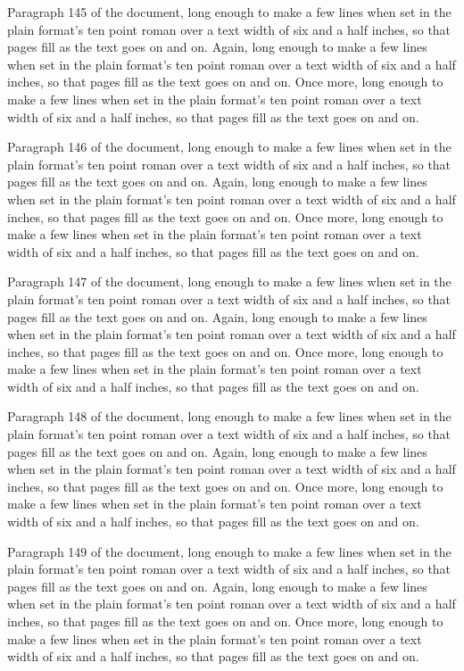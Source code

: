Paragraph 145 of the document, long enough to make a few lines when set in the plain format's ten point roman over a text width of six and a half inches, so that pages fill as the text goes on and on. Again, long enough to make a few lines when set in the plain format's ten point roman over a text width of six and a half inches, so that pages fill as the text goes on and on. Once more, long enough to make a few lines when set in the plain format's ten point roman over a text width of six and a half inches, so that pages fill as the text goes on and on.

Paragraph 146 of the document, long enough to make a few lines when set in the plain format's ten point roman over a text width of six and a half inches, so that pages fill as the text goes on and on. Again, long enough to make a few lines when set in the plain format's ten point roman over a text width of six and a half inches, so that pages fill as the text goes on and on. Once more, long enough to make a few lines when set in the plain format's ten point roman over a text width of six and a half inches, so that pages fill as the text goes on and on.

Paragraph 147 of the document, long enough to make a few lines when set in the plain format's ten point roman over a text width of six and a half inches, so that pages fill as the text goes on and on. Again, long enough to make a few lines when set in the plain format's ten point roman over a text width of six and a half inches, so that pages fill as the text goes on and on. Once more, long enough to make a few lines when set in the plain format's ten point roman over a text width of six and a half inches, so that pages fill as the text goes on and on.

Paragraph 148 of the document, long enough to make a few lines when set in the plain format's ten point roman over a text width of six and a half inches, so that pages fill as the text goes on and on. Again, long enough to make a few lines when set in the plain format's ten point roman over a text width of six and a half inches, so that pages fill as the text goes on and on. Once more, long enough to make a few lines when set in the plain format's ten point roman over a text width of six and a half inches, so that pages fill as the text goes on and on.

Paragraph 149 of the document, long enough to make a few lines when set in the plain format's ten point roman over a text width of six and a half inches, so that pages fill as the text goes on and on. Again, long enough to make a few lines when set in the plain format's ten point roman over a text width of six and a half inches, so that pages fill as the text goes on and on. Once more, long enough to make a few lines when set in the plain format's ten point roman over a text width of six and a half inches, so that pages fill as the text goes on and on.

